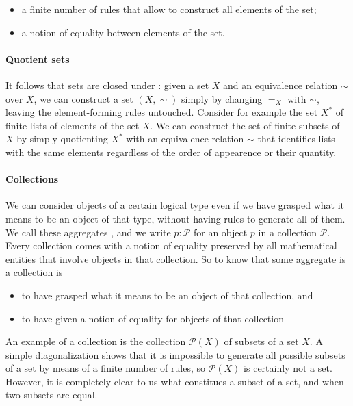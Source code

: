 \begin{itemize}
\item a finite number of rules that allow to construct all elements of the set;
\item a notion of equality between elements of the set.
\end{itemize}

\paragraph{Quotient sets}

It follows that sets are closed under : given a set $X$ and an
equivalence relation $\sim$ over $X$, we can construct a set $(X,\sim)$ simply by
changing $=_X$ with $\sim$, leaving the element-forming rules untouched.
Consider for example the set $X^*$ of finite lists of elements of the set
$X$. We can construct the set of finite subsets of $X$ by simply quotienting
$X^*$ with an equivalence relation $\sim$ that identifies lists with the same
elements regardless of the order of appearence or their quantity.

\paragraph{Collections}

We can consider objects of a certain logical type even if we have grasped what
it means to be an object of that type, without having rules to generate all of
them. We call these aggregates , and we write $p :
\mathcal{P}$ for an object $p$ in a collection $\mathcal{P}$. Every collection
comes with a notion of equality preserved by all mathematical entities that
involve objects in that collection. So to know that some aggregate is a
collection is

\begin{itemize}
\item to have grasped what it means to be an object of that collection, and
\item to have given a notion of equality for objects of that collection
\end{itemize}

An example of a collection is the collection $\mathcal{P}(X)$ of subsets of a
set $X$. A simple diagonalization shows that it is impossible to generate all
possible subsets of a set by means of a finite number of rules, so
$\mathcal{P}(X)$ is certainly not a set. However, it is completely clear to us
what constitues a subset of a set, and when two subsets are equal.

